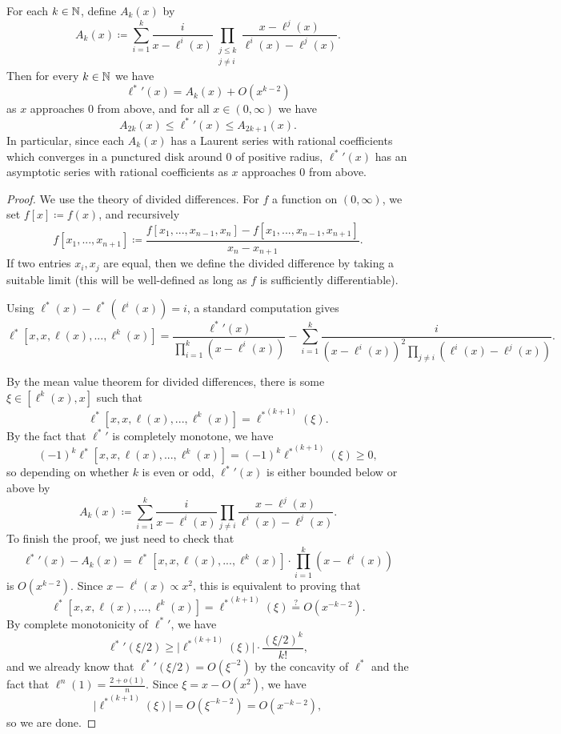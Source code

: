 \documentclass[letterpaper,11pt]{article}
\begin{document}
\begin{prop} For each $k \in \mathbb{N}$, define $A_k(x)$ by
\[
A_k(x) \coloneqq \sum_{i=1}^k \frac{i}{x - \ell^i(x)}\prod_{\substack{j \le k \\ j\ne i}}\frac{x-\ell^j(x)}{\ell^i(x)-\ell^j(x)}.
\]
Then for every $k \in \mathbb{N}$ we have
\[
{\ell^*}'(x) = A_k(x) + O(x^{k-2})
\]
as $x$ approaches $0$ from above, and for all $x \in (0,\infty)$ we have
\[
A_{2k}(x) \le {\ell^*}'(x) \le A_{2k+1}(x).
\]
In particular, since each $A_k(x)$ has a Laurent series with rational coefficients which converges in a punctured disk around $0$ of positive radius, ${\ell^*}'(x)$ has an asymptotic series with rational coefficients as $x$ approaches $0$ from above.
\end{prop}
\begin{proof} We use the theory of divided differences. For $f$ a function on $(0,\infty)$, we set $f[x] \coloneqq f(x)$, and recursively
\[
f[x_1, ..., x_{n+1}] \coloneqq \frac{f[x_1, ..., x_{n-1},x_n] - f[x_1, ..., x_{n-1},x_{n+1}]}{x_n - x_{n+1}}.
\]
If two entries $x_i, x_j$ are equal, then we define the divided difference by taking a suitable limit (this will be well-defined as long as $f$ is sufficiently differentiable).

Using $\ell^*(x) - \ell^*(\ell^i(x)) = i$, a standard computation gives
\[
\ell^*[x,x,\ell(x),...,\ell^k(x)] = \frac{{\ell^*}'(x)}{\prod_{i=1}^k(x-\ell^i(x))} - \sum_{i=1}^k \frac{i}{(x - \ell^i(x))^2\prod_{j\ne i}(\ell^i(x) - \ell^j(x))}.
\]
\begin{comment}
and
\[
\ell^*[\varepsilon(x),x,x,\ell(x),...,\ell^{k-1}(x)] = -\frac{{\ell^*}'(x)}{(\varepsilon(x)-x)\prod_{i=1}^{k-1}(x-\ell^i(x))} + \frac{-1}{(\varepsilon(x)-x)^2\prod_{j}(\varepsilon(x) - \ell^j(x))} - \sum_{i=1}^{k-1} \frac{i}{(\varepsilon(x)-\ell^i(x))(x - \ell^i(x))^2\prod_{j\ne i}(\ell^i(x) - \ell^j(x))} \ge 0.
\]
\end{comment}
By the mean value theorem for divided differences, there is some $\xi \in [\ell^k(x),x]$ such that
\[
\ell^*[x,x,\ell(x),...,\ell^k(x)] = {\ell^*}^{(k+1)}(\xi).
\]
By the fact that ${\ell^*}'$ is completely monotone, we have
\[
(-1)^k\ell^*[x,x,\ell(x),...,\ell^k(x)] = (-1)^k{\ell^*}^{(k+1)}(\xi) \ge 0,
\]
so depending on whether $k$ is even or odd, ${\ell^*}'(x)$ is either bounded below or above by
\[
A_k(x) \coloneqq \sum_{i=1}^k \frac{i}{x - \ell^i(x)}\prod_{j\ne i}\frac{x-\ell^j(x)}{\ell^i(x)-\ell^j(x)}.
\]
To finish the proof, we just need to check that
\[
{\ell^*}'(x) - A_k(x) = \ell^*[x,x,\ell(x),...,\ell^k(x)]\cdot\prod_{i=1}^k(x-\ell^i(x))
\]
is $O(x^{k-2})$. Since $x - \ell^i(x) \propto x^2$, this is equivalent to proving that
\[
\ell^*[x,x,\ell(x),...,\ell^k(x)] = {\ell^*}^{(k+1)}(\xi) \stackrel{?}{=} O(x^{-k-2}).
\]
By complete monotonicity of ${\ell^*}'$, we have
\[
{\ell^*}'(\xi/2) \ge \big|{\ell^*}^{(k+1)}(\xi)\big| \cdot \frac{(\xi/2)^k}{k!},
\]
and we already know that ${\ell^*}'(\xi/2) = O(\xi^{-2})$ by the concavity of $\ell^*$ and the fact that $\ell^n(1) =  \frac{2+o(1)}{n}$. Since $\xi = x - O(x^2)$, we have
\[
\big|{\ell^*}^{(k+1)}(\xi)\big| = O(\xi^{-k-2}) = O(x^{-k-2}),
\]
so we are done.
\begin{comment}
$A_k(x) - A_{k+1}(x) = O(x^{k-2})$ for each $k$.


\end{comment}
\end{proof}
\end{document}
